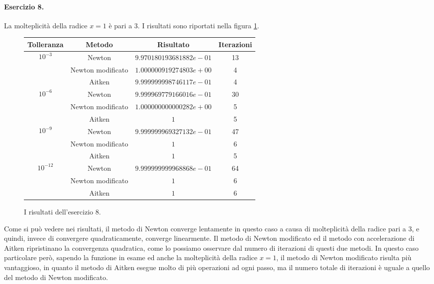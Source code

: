 \paragraph{Esercizio 8.} La molteplicità della radice $x = 1$ è pari a 3. I risultati sono riportati nella figura \ref{fig:esercizio8}.

\begin{figure}
  \centering
  \begin{tabular}{ |c|c|c|c| }
    \hline
    Tolleranza & Metodo & Risultato & Iterazioni \\
    \hline\hline
    
    \multirow{3}{4em}{\[ 10^{-3} \]} & Newton & $9.970180193681882e-01$ & 13 \\
    \cline{2-4}
    & Newton modificato & $1.000000919274803e+00$ & 4 \\
    \cline{2-4}
    & Aitken & $9.999999998746117e-01$ & 4 \\
    \hline\hline
    
    \multirow{3}{4em}{\[ 10^{-6} \]} & Newton & $9.999969779166016e-01$ & 30 \\
    \cline{2-4}
    & Newton modificato & $1.000000000000282e+00$ & 5 \\
    \cline{2-4}
    & Aitken & $1$ & 5 \\
    \hline\hline
    
    \multirow{3}{4em}{\[ 10^{-9} \]} & Newton & $9.999999969327132e-01$ & 47 \\
    \cline{2-4}
    & Newton modificato & $1$ & 6 \\
    \cline{2-4}
    & Aitken & $1$ & 5 \\
    \hline\hline
    
    \multirow{3}{4em}{\[ 10^{-12} \]} & Newton & $9.999999999968868e-01$ & 64 \\
    \cline{2-4}
    & Newton modificato & $1$ & 6 \\
    \cline{2-4}
    & Aitken & $1$ & 6 \\
    \hline
  \end{tabular}
  \caption{I risultati dell'esercizio 8.}
  \label{fig:esercizio8}
\end{figure}

Come si può vedere nei risultati, il metodo di Newton converge lentamente in questo caso a causa di molteplicità della radice pari a 3, e quindi, invece di convergere quadraticamente, converge linearmente. Il metodo di Newton modificato ed il metodo con accelerazione di Aitken ripristinano la convergenza quadratica, come lo possiamo osservare dal numero di iterazioni di questi due metodi. In questo caso particolare però, sapendo la funzione in esame ed anche la molteplicità della radice $x = 1$, il metodo di Newton modificato risulta più vantaggioso, in quanto il metodo di Aitken esegue molto di più operazioni ad ogni passo, ma il numero totale di iterazioni è uguale a quello del metodo di Newton modificato.